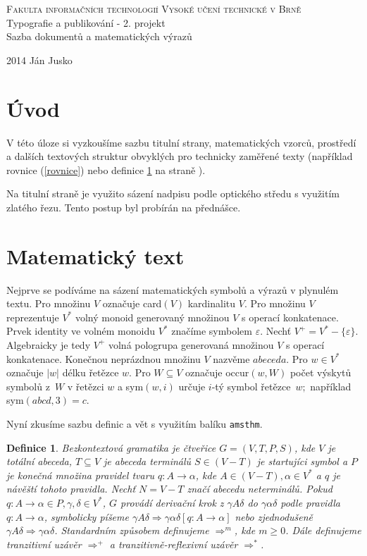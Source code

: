 \documentclass[a4paper,11pt,twocolumn]{article}
\newtheorem{definition}[theorem]{Definice}
\begin{document}
\onecolumn
\thispagestyle{empty}
\begin{center}
	\Huge
	\textsc{Fakulta informačních technologií
Vysoké učení technické v Brně}\\
{ \LARGE Typografie a publikování - 2. projekt\\
Sazba dokumentů a matematických výrazů\\}
\end{center}
{\Large 2014 \hfill
Ján Jusko}

\newpage
\setcounter{page}{1}
\twocolumn
\section*{Úvod}
\noindent
V této úloze si vyzkoušíme sazbu titulní strany, matematických vzorců, prostředí a dalších textových struktur obvyklých pro technicky zaměřené texty (například rovnice (\ref{rovnice}) nebo definice \ref{definice} na straně \pageref{definice}).
\par
Na titulní straně je využito sázení nadpisu podle optického středu s využitím zlatého řezu. Tento postup byl probírán na přednášce.
\section{Matematický text}
Nejprve se podíváme na sázení matematických symbolů a výrazů v plynulém textu. Pro množinu $V$ označuje card$(V)$ kardinalitu $V$.
Pro množinu $V$ reprezentuje $V^*$ volný monoid generovaný množinou $V$ s operací konkatenace. Prvek identity ve volném monoidu $V^*$ značíme symbolem $\varepsilon$. Nechť $V^+ = V^* - \{\varepsilon\}$. Algebraicky je tedy $V^+$ volná pologrupa generovaná množinou $V$ s operací konkatenace. Konečnou neprázdnou množinu $V$ nazvěme $abeceda$. Pro $w \in V^*$ označuje $|w|$ délku řetězce $w$. Pro $W \subseteq V$ označuje occur$(w,W)$ počet výskytů symbolů z~$W$ v řetězci $w$ a sym$(w,i)$ určuje $i$-tý symbol řetězce~$w;$ například sym$(abcd,3)=c$.
\par
Nyní zkusíme sazbu definic a vět s využitím balíku \texttt{amsthm}.

\begin{definition}
\label{definice}
Bezkontextová gramatika  \emph{je čtveřice $G=(V,T,P,S)$, kde $V$  je totální abeceda, $T \subseteq V$ je abeceda terminálů $S \in (V-T)$ je startujíci symbol a $P$ je konečná množina \emph{pravidel} tvaru $q\colon A\rightarrow \alpha$, kde $A \in (V-T),\alpha \in V^* $ a $q$ je návěští tohoto pravidla. Nechť $N=V-T$ značí abecedu neterminálů. Pokud $q\colon A\rightarrow \alpha\in P,\gamma,\delta\in V^*$, $G$ provádí derivační krok z $\gamma A \delta$ do $\gamma\alpha\delta$ podle pravidla $q\colon A\rightarrow \alpha$, symbolicky píšeme $\gamma A\delta \Rightarrow\gamma\alpha\delta [q\colon A\rightarrow\alpha]$ nebo zjednodušeně $\gamma A\delta \Rightarrow\gamma\alpha\delta$. Standardním způsobem definujeme $\Rightarrow^m$, kde $m\geq 0$. Dále definujeme tranzitivní uzávěr $\Rightarrow^+$ a tranzitivně-reflexivní uzávěr $\Rightarrow^*$. }
\end{definition}
\end{document}
